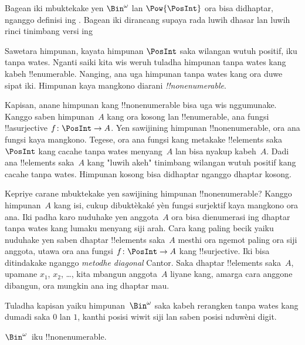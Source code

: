 \documentclass[../../../include/open-logic-section]{subfiles}
\begin{document}


\begin{editorial}
  Bagean iki mbuktekake yen $\Bin^\omega$ lan
  $\Pow{\PosInt}$ ora bisa didhaptar, nganggo definisi ing .
  Bagean iki dirancang supaya rada luwih dhasar lan luwih rinci
  tinimbang versi ing 
\end{editorial}

Sawetara himpunan, kayata himpunan $\PosInt$ saka wilangan wutuh positif,
iku tanpa wates. Nganti saiki kita wis weruh tuladha himpunan tanpa wates
kang kabeh !!{enumerable}. Nanging, ana uga himpunan tanpa wates
kang ora duwe sipat iki. Himpunan kaya mangkono diarani \emph{!!{nonenumerable}}.

Kapisan, anane himpunan kang !!{nonenumerable} bisa uga wis nggumunake.
Kanggo saben himpunan~$A$ kang ora kosong lan !!{enumerable}, ana
fungsi !!a{surjective} $f \colon \PosInt \to A$. Yen sawijining himpunan
!!{nonenumerable}, ora ana fungsi kaya mangkono. Tegese, ora ana fungsi
kang metakake !!{element}s saka~$\PosInt$ kang cacahe tanpa wates menyang~$A$
lan bisa nyakup kabeh~$A$. Dadi ana !!{element}s saka~$A$ kang
"luwih akeh" tinimbang wilangan wutuh positif kang cacahe tanpa wates.
Himpunan kosong bisa didhaptar nganggo dhaptar kosong.

Kepriye carane mbuktekake yen sawijining himpunan !!{nonenumerable}?
Kanggo himpunan~$A$ kang isi, cukup dibuktèkaké yèn fungsi surjektif kaya mangkono ora ana.
Iki padha karo nuduhake yen anggota~$A$ ora bisa dienumerasi ing dhaptar
tanpa wates kang lumaku menyang siji arah. Cara kang paling becik yaiku
nuduhake yen saben dhaptar !!{element}s saka~$A$ mesthi ora ngemot paling
ora siji anggota, utawa ora ana fungsi $f\colon \PosInt \to A$ kang
!!{surjective}. Iki bisa ditindakake nganggo \emph{metodhe diagonal} Cantor.
Saka dhaptar !!{element}s saka~$A$, upamane $x_1$, $x_2$, \dots,
kita mbangun anggota~$A$ liyane kang, amarga cara anggone dibangun,
ora mungkin ana ing dhaptar mau.

Tuladha kapisan yaiku himpunan~$\Bin^\omega$ saka kabeh rerangken
tanpa wates kang dumadi saka $0$ lan $1$, kanthi posisi wiwit siji
lan saben posisi nduwèni digit.

\begin{thm}
$\Bin^\omega$~iku !!{nonenumerable}.
\end{thm}
\end{document}

